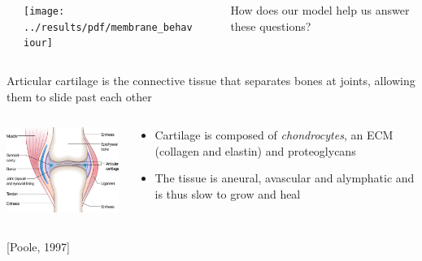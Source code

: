 \documentclass[ignorenonframetext]{beamer}
\newcommand{\references}[1] {
  \begin{flushright}
    \scriptsize [#1] \normalsize
  \end{flushright}
}
\begin{document}
\begin{frame}
\begin{columns}
    \begin{column}{2cm}
    \end{column}
    \begin{column}{2cm}
      \texttt{[image: ../results/pdf/membrane\_behaviour]}
    \end{column}
    \begin{column}{0.5cm}
    \end{column}
    \begin{column}{8cm}
      How does our model help us answer these questions?
    \end{column}
  \end{columns}
\end{frame}


\begin{frame}{Articular cartilage is the connective tissue that
    separates bones at joints, allowing them to slide past each other}

  \begin{columns}

    \begin{column}{6cm}
      \includegraphics[width=6cm]{../images/pdf/joint}
    \end{column}

    \begin{column}{6cm}
      \begin{itemize}
      \item <1-> Cartilage is composed of {\em chondrocytes}, an ECM
        (collagen and elastin) and proteoglycans\\[0.5cm]
        \pause
      \item<2-> The tissue is aneural, avascular and alymphatic and is
        thus slow to grow and heal
      \end{itemize}
    \end{column}

  \end{columns}

  \references{Poole, 1997}

\end{frame}
\end{document}
